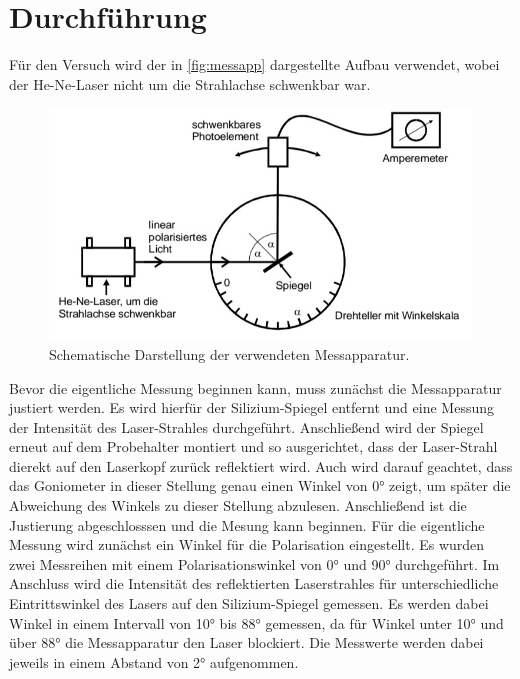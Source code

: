 \section{Durchführung}
\label{sec:Durchführung}

Für den Versuch wird der in \autoref{fig:messapp} dargestellte Aufbau verwendet, wobei der He-Ne-Laser nicht um die Strahlachse schwenkbar war.

\begin{figure}[H]
	\centering
	\includegraphics[width=0.6\linewidth]{data/v407Messapparatur.jpg}
	\caption{Schematische Darstellung der verwendeten Messapparatur.\cite{Anleitung407}}
	\label{fig:messapp}
\end{figure}

\noindent
Bevor die eigentliche Messung beginnen kann, muss zunächst die Messapparatur justiert werden.
Es wird hierfür der Silizium-Spiegel entfernt und eine Messung der Intensität des Laser-Strahles durchgeführt. Anschließend wird der Spiegel erneut auf dem Probehalter montiert
und so ausgerichtet, dass der Laser-Strahl dierekt auf den Laserkopf zurück reflektiert wird. Auch wird darauf geachtet, dass das Goniometer in dieser Stellung genau einen Winkel
von 0° zeigt, um später die Abweichung des Winkels zu dieser Stellung abzulesen. Anschließend ist die Justierung abgeschlosssen und die Mesung kann beginnen.
\newline\newline
Für die eigentliche Messung wird zunächst ein Winkel für die Polarisation eingestellt. Es wurden zwei Messreihen mit einem Polarisationswinkel von 0° und 90° durchgeführt.
Im Anschluss wird die Intensität des reflektierten Laserstrahles für unterschiedliche Eintrittswinkel des Lasers auf den Silizium-Spiegel gemessen. Es werden dabei Winkel in
einem Intervall von 10° bis 88° gemessen, da für Winkel unter 10° und über 88° die Messapparatur den Laser blockiert. Die Messwerte werden dabei jeweils in einem Abstand
von 2° aufgenommen.